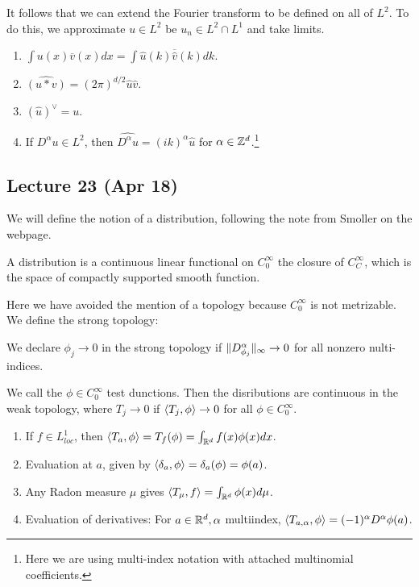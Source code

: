 \documentclass[10pt, twoside]{article}
\begin{document}
    It follows that we can extend the Fourier transform to be defined on all of
    $L^2$. To do this, we approximate $u \in L^2$ be $u_n \in L^2 \cap L^1$ and
    take limits.

    \begin{prop} \begin{enumerate} \item $\int u(x)\overline{v}(x) dx = \int
        \widehat{u}(k) \overline{\widehat{v}}(k) dk$.  \item $\widehat{(u * v)}
        = (2\pi)^{d/2} \widehat{u} \widehat{v}$.  \item $(\widehat{u})^{\vee} =
        u$.  \item If $D^{\alpha} u \in L^2$, then $\widehat{D^{\alpha} u} =
        (ik)^{\alpha} \widehat{u}$ for $\alpha \in \mathbb{Z}^d$.\footnote{Here we are
        using multi-index notation with attached multinomial coefficients.}
\end{enumerate} \end{prop}

    \subsection{Lecture 23 (Apr 18)} We will define the notion of a
    distribution, following the note from Smoller on the webpage.

    \begin{defn}[Distribution] A distribution is a continuous linear functional
    on $C^{\infty}_0$ the closure of $C^{\infty}_C$, which is the space of
compactly supported smooth function.  \end{defn}

    Here we have avoided the mention of a topology because $C^{\infty}_0$ is
    not metrizable. We define the strong topology:

    \begin{defn} We declare $\phi_j \to 0$ in the strong
    topology if $\lVert D^{\alpha}_{\phi_j}\rVert_{\infty} \to 0$ for all nonzero
nulti-indices.  \end{defn}
       
    We call the $\phi \in C_0^{\infty}$ test dunctions. Then the disributions
    are continuous in the weak topology, where $T_j \to 0$ if $\langle T_j,\phi\rangle
    \to 0$ for all $\phi \in C_0^{\infty}$.

    \begin{exm} \begin{enumerate} \item If $f \in L^1_{loc}$, then
        $\langle T_a,\phi\rangle = T_f(\phi) = \int_{\mathbb{R}^d} f(x) \phi(x) dx$.  \item
        Evaluation at $a$, given by $\langle\delta_a,\phi\rangle = \delta_a(\phi) =
        \phi(a)$.  \item Any Radon measure $\mu$ gives $\langle T_{\mu},f\rangle =
        \int_{\mathbb{R}^d} \phi(x) d \mu$.  \item Evaluation of derivatives: For $a
\in \mathbb{R}^d, \alpha$ multiindex, $\langle T_{a,\alpha},\phi\rangle = (-1)^{\alpha}
D^{\alpha}\phi(a)$.  \end{enumerate} \end{exm}
\end{document}
